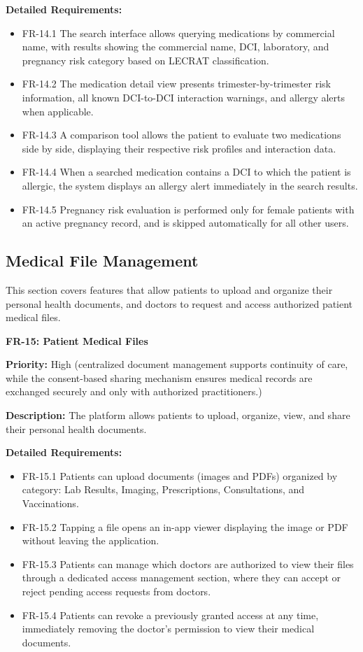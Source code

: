 \textbf{Detailed Requirements:}
\begin{itemize}
    \item FR-14.1 \; The search interface allows querying medications by commercial
    name, with results showing the commercial name, DCI, laboratory, and pregnancy
    risk category based on LECRAT classification.
    \item FR-14.2 \; The medication detail view presents trimester-by-trimester risk
    information, all known DCI-to-DCI interaction warnings, and allergy alerts when
    applicable.
    \item FR-14.3 \; A comparison tool allows the patient to evaluate two medications
    side by side, displaying their respective risk profiles and interaction data.
    \item FR-14.4 \; When a searched medication contains a DCI to which the patient is
    allergic, the system displays an allergy alert immediately in the search results.
    \item FR-14.5 \; Pregnancy risk evaluation is performed only for female patients
    with an active pregnancy record, and is skipped automatically for all other users.
\end{itemize}

\subsection{Medical File Management}

This section covers features that allow patients to upload and organize their personal
health documents, and doctors to request and access authorized patient medical files.

\textbf{FR-15: Patient Medical Files}

\textbf{Priority:} High (centralized document management supports continuity of care, while the consent-based sharing mechanism ensures medical records are exchanged securely and only with authorized practitioners.)

\textbf{Description:} The platform allows patients to upload, organize, view, and share
their personal health documents.

\textbf{Detailed Requirements:}
\begin{itemize}
    \item FR-15.1 \; Patients can upload documents (images and PDFs) organized
    by category: Lab Results, Imaging, Prescriptions, Consultations, and Vaccinations.
    \item FR-15.2 \; Tapping a file opens an in-app viewer displaying the image or PDF
    without leaving the application.
    \item FR-15.3 \; Patients can manage which doctors are authorized to view
    their files through a dedicated access management section, where they can accept
    or reject pending access requests from doctors.
    \item FR-15.4 \; Patients can revoke a previously granted access at any time,
    immediately removing the doctor's permission to view their medical documents.
\end{itemize}

